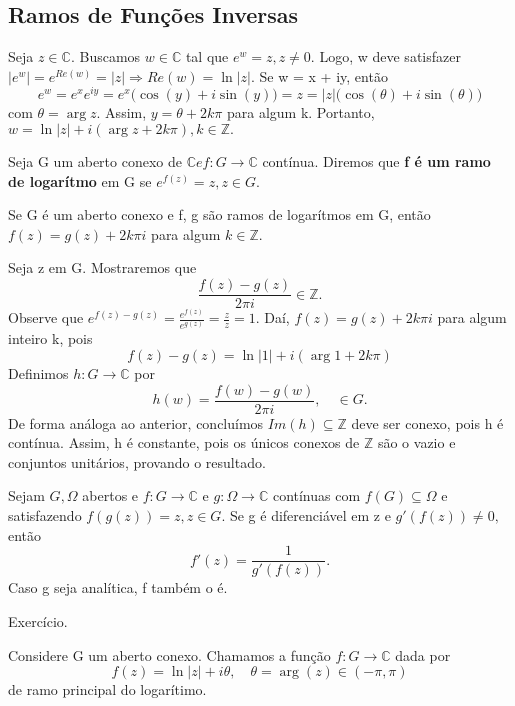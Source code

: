 \documentclass[ComplexAnalysis/complex.tex]{subfiles}
\begin{document}
\subsection{Ramos de Funções Inversas}
Seja $z\in \mathbb{C}.$ Buscamos $w\in \mathbb{C}$ tal que $e^{w} = z, z\neq0.$ Logo, w deve satisfazer $|e^{w}|
	= e^{Re(w)} = |z|\Rightarrow Re(w) = \ln{|z|}.$ Se w = x + iy, então
$$
	e^{w} = e^{x}e^{iy} = e^{x}\biggl(\cos{(y)} + i\sin{(y)}\biggr) = z = |z|\biggl(\cos{(\theta)} + i\sin{(\theta)}\biggr)
$$
com $\theta = \arg{z}.$ Assim, $y = \theta + 2k\pi$ para algum k. Portanto, $w = \ln{|z|} + i(\arg{z} + 2k\pi), k\in \mathbb{Z}.$
\begin{def*}
	Seja G um aberto conexo de $\mathbb{C} e f:G\rightarrow \mathbb{C}$ contínua. Diremos que \textbf{f é um ramo de logarítmo}
	em G se $e^{f(z)} = z, z\in{G}.$
\end{def*}
\begin{prop*}
	Se G é um aberto conexo e f, g são ramos de logarítmos em G, então $f(z) = g(z) + 2k\pi i$ para algum
	$k\in \mathbb{Z}$.
\end{prop*}
\begin{proof*}
	Seja z em G. Mostraremos que
	$$
		\frac{f(z) - g(z)}{2\pi i}\in \mathbb{Z}.
	$$
	Observe que $e^{f(z) - g(z)} = \frac{e^{f(z)}}{e^{g(z)}} = \frac{z}{z} = 1.$ Daí, $f(z) = g(z) + 2k\pi i$ para algum
	inteiro k, pois
	$$
		f(z) - g(z) = \ln{|1|} + i(\arg{1} + 2k\pi)
	$$
	Definimos $h:G\rightarrow \mathbb{C}$ por
	$$
		h(w) = \frac{f(w) - g(w)}{2 \pi i}, \quad \in{G}.
	$$
	De forma análoga ao anterior, concluímos $Im(h)\subseteq{\mathbb{Z}}$ deve ser conexo, pois h é contínua. Assim,
	h é constante, pois os únicos conexos de $\mathbb{Z}$ são o vazio e conjuntos unitários, provando o resultado. \qedsymbol
\end{proof*}
\begin{prop*}
	Sejam $G, \Omega$ abertos e $f:G\rightarrow \mathbb{C}\text{ e }g:\Omega\rightarrow \mathbb{C}$ contínuas com $f(G)\subseteq{\Omega}$
	e satisfazendo $f(g(z)) = z, z\in{G}.$ Se g é diferenciável em z e $g'(f(z))\neq0,$ então
	$$
		f'(z) = \frac{1}{g'(f(z))}.
	$$
	Caso g seja analítica, f também o é.
\end{prop*}
\begin{proof*}
	Exercício.
\end{proof*}
Considere G um aberto conexo. Chamamos a função $f:G\rightarrow \mathbb{C} $ dada por
$$
	f(z) = \ln{|z|} + i \theta, \quad \theta=\arg{(z)}\in{(-\pi, \pi)}
$$
de ramo principal do logarítimo.
\end{document}
